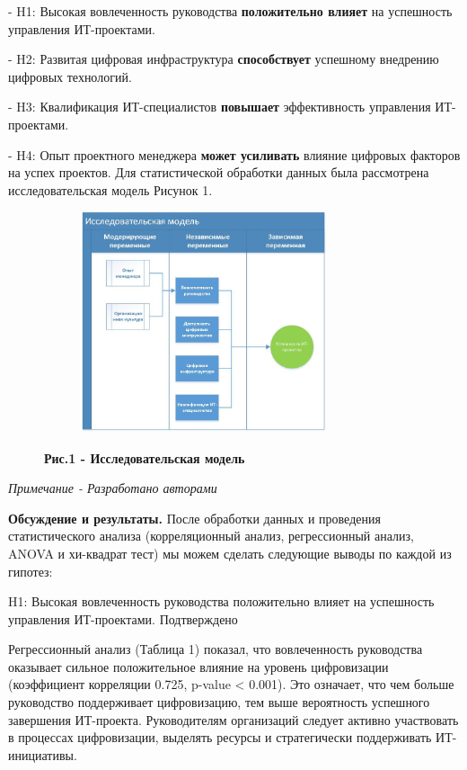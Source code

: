 - H1: Высокая вовлеченность руководства {\bfseries положительно влияет} на
успешность управления ИТ-проектами.

- H2: Развитая цифровая инфраструктура {\bfseries способствует} успешному
внедрению цифровых технологий.

- H3: Квалификация ИТ-специалистов {\bfseries повышает} эффективность
управления ИТ-проектами.

- H4: Опыт проектного менеджера {\bfseries может усиливать} влияние
цифровых факторов на успех проектов.
Для статистической обработки данных была рассмотрена исследовательская
модель Рисунок 1.

\begin{figure}
\centering

\begin{figure}[H]
	\centering
	\includegraphics[width=0.8\textwidth]{media/ekon2/image47}
	\caption*{}
\end{figure}

\caption{{\bfseries Рис.1 - Исследовательская модель}}
\end{figure}

\emph{Примечание - Разработано авторами}

{\bfseries Обсуждение и результаты.} После обработки данных и проведения
статистического анализа (корреляционный анализ, регрессионный анализ,
ANOVA и хи-квадрат тест) мы можем сделать следующие выводы по каждой из
гипотез:

H1: Высокая вовлеченность руководства положительно влияет на успешность
управления ИТ-проектами. Подтверждено

Регрессионный анализ (Таблица 1) показал, что вовлеченность руководства
оказывает сильное положительное влияние на уровень цифровизации
(коэффициент корреляции 0.725, p-value \textless{} 0.001). Это означает,
что чем больше руководство поддерживает цифровизацию, тем выше
вероятность успешного завершения ИТ-проекта. Руководителям организаций
следует активно участвовать в процессах цифровизации, выделять ресурсы и
стратегически поддерживать ИТ-инициативы.

